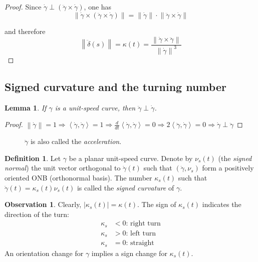 \documentclass[a4paper,11pt,notitlepage,fullpage]{paper}
\newcommand{\dy}{\dot\gamma}
\newcommand{\ddy}{\ddot\gamma}
\theoremstyle{plain}
\newtheorem{lem}[thm]{Lemma}
\theoremstyle{definition}
\newtheorem{defn}[thm]{Definition} %
\newtheorem{obsv}[thm]{Observation}
\begin{document}
\begin{proof}
Since $\dot\gamma \perp (\ddot\gamma \times \dot\gamma)$, one has 
\begin{equation*}
\left\|\dot\gamma \times (\ddot\gamma \times \dot\gamma)\right\| = \left\|\dot\gamma\right\| \cdot \left\|\ddot\gamma \times \dot\gamma\right\|
\end{equation*}

and therefore 
\begin{equation*}
\left\|\ddot\delta(s)\right\| = \kappa(t) = \frac{\left\|\dy \times \ddy\right\|}{\left\|\dy\right\|^3}
\end{equation*}
\end{proof}


\subsection{Signed curvature and the turning number}

\begin{lem}
If $\gamma$ is a unit-speed curve, then $\ddot\gamma \perp \dot\gamma$.
\end{lem}

\begin{proof} $\left\|\dot\gamma\right\| = 1 \Rightarrow \left\langle\dot\gamma, \dot\gamma\right\rangle = 1 \Rightarrow \frac{d}{dt} \left\langle\dot\gamma, \dot\gamma\right\rangle = 0 \Rightarrow 2 \left\langle\ddot\gamma, \dot\gamma\right\rangle = 0 \Rightarrow \dot\gamma \perp \ddot\gamma$ \end{proof}


\begin{figure}[H]
\centering
\def\svgwidth{0.3\textwidth}

\caption{$\ddy$ is also called the \emph{acceleration}.}
\label{fig:velocity-and-acceleration}
\end{figure}


\begin{defn}
Let $\gamma$ be a planar unit-speed curve. Denote by $\nu_s(t)$ (the \emph{signed normal}) the unit vector orthogonal to $\dot\gamma(t)$ such that $(\dot\gamma, \nu_s)$ form a positively oriented ONB (orthonormal basis). The number $\kappa_s(t)$ such that $\ddot\gamma(t) = \kappa_s(t) \nu_s(t)$ is called the \emph{signed curvature} of $\gamma$.
\end{defn}

\begin{obsv}
Clearly, $|\kappa_s(t)| = \kappa(t)$. The sign of $\kappa_s(t)$ indicates the direction of the turn:
\begin{align*}
\kappa_s &< 0\text{: right turn} \\
\kappa_s &> 0\text{: left turn} \\
\kappa_s &= 0\text{: straight}
\end{align*}
An orientation change for $\gamma$ implies a sign change for $\kappa_s(t)$.
\end{obsv}
\end{document}
